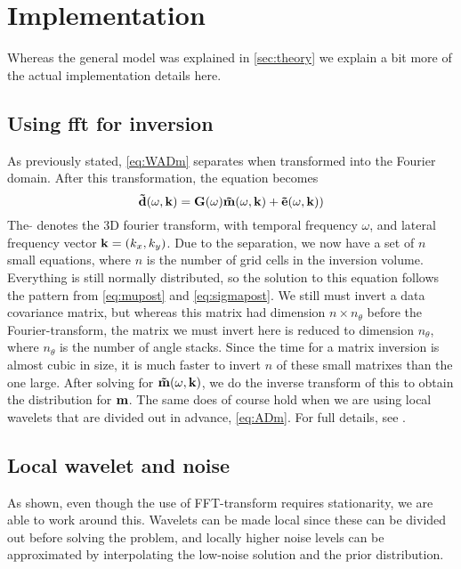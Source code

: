 \chapter{Implementation}
\label{sec:implementation}

Whereas the general model was explained in \autoref{sec:theory} we explain a bit more of the actual implementation details here.

\section{Using fft for inversion}
As previously stated, \autoref{eq:WADm} separates when transformed into the Fourier domain. After this transformation, the equation becomes
\begin{equation}
\label{eq:fourierinv}
\mathbf{\tilde{d}}(\omega,\mathbf{k}) = \mathbf{G}(\omega)\mathbf{\tilde{m}}(\omega,\mathbf{k}) + \mathbf{\tilde{e}}(\omega,\mathbf{k}))
\end{equation}
The $\tilde{ }$ denotes the 3D fourier transform, with temporal frequency $\omega$, and lateral frequency vector $\mathbf{k} = (k_x,k_y)$. Due to the separation, we now have a set of $n$ small equations, where $n$ is the number of grid cells in the inversion volume. Everything is still normally distributed, so the solution to this equation follows the pattern from \autoref{eq:mupost} and \autoref{eq:sigmapost}. We still must invert a data covariance matrix, but whereas this matrix had dimension $n\times n_\theta$ before the Fourier-transform, the matrix we must invert here is reduced to dimension $n_\theta$, where $n_\theta$ is the number of angle stacks. Since the time for a matrix inversion is almost cubic in size, it is much faster to invert $n$ of these small matrixes than the one large. After solving for $\mathbf{\tilde{m}}(\omega,\mathbf{k})$, we do the inverse transform of this to obtain the distribution for $\mathbf{m}$. The same does of course hold when we are using local wavelets that are divided out in advance, \autoref{eq:ADm}. For full details, see \cite{geo68ab2}.

\section{Local wavelet and noise}
\label{sec:nonstationaryimp}
As shown, even though the use of FFT-transform requires stationarity, we are able to work around this. Wavelets can be made local since these can be divided out before solving the problem, and locally higher noise levels can be approximated by interpolating the low-noise solution and the prior distribution.

